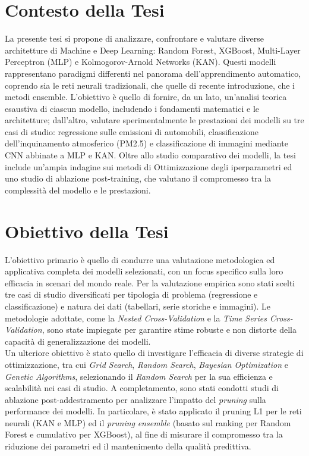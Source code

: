 \documentclass[a4paper,12pt]{report}
\begin{document}
	\section*{Contesto della Tesi}
	La presente tesi si propone di analizzare, confrontare e valutare diverse architetture di Machine e Deep Learning: Random Forest, XGBoost, Multi-Layer Perceptron (MLP) e Kolmogorov-Arnold Networks
	(KAN). Questi modelli rappresentano paradigmi differenti nel panorama dell'apprendimento automatico, coprendo sia le reti neurali tradizionali, che quelle di recente introduzione, che i metodi ensemble. L'obiettivo è quello di fornire, da un lato, un'analisi teorica esaustiva di ciascun modello, includendo i fondamenti matematici e le architetture; dall'altro, valutare sperimentalmente le prestazioni dei modelli su tre casi di studio: regressione sulle emissioni di automobili, classificazione dell'inquinamento atmosferico (PM2.5) e classificazione di immagini mediante CNN abbinate a MLP e KAN. Oltre allo studio comparativo dei modelli, la tesi include un'ampia indagine sui metodi di Ottimizzazione degli iperparametri ed uno studio di ablazione post-training, che valutano il compromesso tra la complessità del modello e le prestazioni.
	
	\section*{Obiettivo della Tesi}
	L'obiettivo primario è quello di condurre una valutazione metodologica ed applicativa completa dei modelli selezionati, con un focus specifico sulla loro efficacia in scenari del mondo reale. Per la valutazione empirica sono stati scelti tre casi di studio diversificati per tipologia di problema (regressione e classificazione) e natura dei dati (tabellari, serie storiche e immagini). Le metodologie adottate, come la \textit{Nested Cross-Validation} e la \textit{Time Series Cross-Validation}, sono state impiegate per garantire stime robuste e non distorte della capacità di generalizzazione dei modelli. \\
	Un ulteriore obiettivo è stato quello di investigare l'efficacia di diverse strategie di ottimizzazione, tra cui \textit{Grid Search}, \textit{Random Search}, \textit{Bayesian Optimization} e \textit{Genetic Algorithms}, selezionando il \textit{Random Search} per la sua efficienza e scalabilità nei casi di studio. A completamento, sono stati condotti studi di ablazione post-addestramento per analizzare l'impatto del \textit{pruning} sulla performance dei modelli. In particolare, è stato applicato il pruning L1 per le reti neurali (KAN e MLP) ed il \textit{pruning} \textit{ensemble} (basato sul ranking per Random Forest e cumulativo per XGBoost), al fine di misurare il compromesso tra la riduzione dei parametri ed il mantenimento della qualità predittiva.
	
\end{document}
